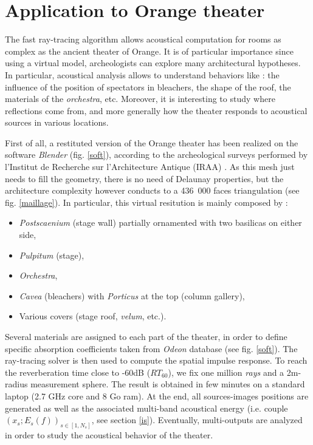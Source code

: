 \documentclass[AMA,STIX1COL]{WileyNJD-v2}
\begin{document}
\section{Application to Orange theater}

The fast ray-tracing algorithm allows acoustical computation for rooms as complex as the ancient theater of Orange. It is of particular importance since using a virtual model, archeologists can explore many architectural hypotheses. In particular, acoustical analysis allows to understand behaviors like : the influence of the position of spectators in bleachers, the shape of the roof, the materials of the \textit{orchestra}, etc. Moreover, it is interesting to study where reflections come from, and more generally how the theater responds to acoustical sources in various locations.     

First of all, a restituted version of the Orange theater has been realized on the software \textit{Blender} (fig. \ref{soft}), according to the archeological surveys performed by l'Institut de Recherche sur l'Architecture Antique (IRAA) \cite{orangeTxt}. As this mesh just needs to fill the geometry, there is no need of Delaunay properties, but the architecture complexity however conducts to a 436~000 faces triangulation (see fig. \ref{maillage}). In particular, this virtual resitution is mainly composed by :
\begin{itemize}
 \item \textit{Postscaenium} (stage wall) partially ornamented with two basilicas on either side,
 \item \textit{Pulpitum} (stage),
 \item \textit{Orchestra},
 \item \textit{Cavea} (bleachers) with \textit{Porticus} at the top (column gallery),
  \item Various covers (stage roof, \textit{velum}, etc.).
\end{itemize}
Several materials are assigned to each part of the theater, in order to define specific absorption coefficients taken from \textit{Odeon} database \cite{odeon} (see fig. \ref{soft}). The ray-tracing solver is then used to compute the spatial impulse response. To reach the reverberation time close to -60dB ($RT_{60}$), we fix one million \textit{rays} and a 2m-radius measurement sphere. The result is obtained in few minutes on a standard laptop (2.7 GHz core and 8 Go ram). At the end, all sources-images positions are generated as well as the associated multi-band acoustical energy (i.e. couple $(x_s;E_s(f))_{s \in [1, N_s]}$, see section \ref{is}). Eventually, multi-outputs are analyzed in order to study the acoustical behavior of the theater.
\end{document}
